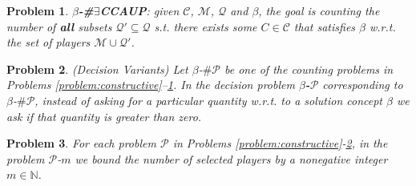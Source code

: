 \documentclass[letterpaper]{article} %
\newtheorem{problem}{Problem}
\newtheorem{remark}{Remark}
\begin{document}
\begin{problem}
\label{problem:exists-CCAUP}
{\normalfont \textbf{$\beta$-\#$\exists$CCAUP}:} given $\mathcal{C}$, $\mathcal{M}$, $\mathcal{Q}$ and $\beta$, the goal is counting the number of \textbf{all} subsets $\mathcal{Q}' \subseteq \mathcal{Q}$ s.t. there exists some $C \in \mathcal{C}$ that satisfies $\beta$ w.r.t. the set of players $\mathcal{M} \cup \mathcal{Q}'$.
\end{problem}
\begin{problem}
\label{problem:Decision} 
{\normalfont (Decision Variants)}
Let {\normalfont $\beta$-$\# \mathcal{P}$} be one of the counting problems in Problems \ref{problem:constructive}--\ref{problem:exists-CCAUP}. In the decision problem {\normalfont \textbf{$\beta$-$\mathcal{P}$}} corresponding to {\normalfont $\beta$-$\#\mathcal{P}$}, instead of asking for a particular quantity w.r.t. to a solution concept $\beta$ we ask if that quantity is greater than zero.
\end{problem}
\begin{problem}
\label{problem:bounded} 
For each problem {\normalfont $\mathcal{P}$} in Problems \ref{problem:constructive}-\ref{problem:Decision}, in the problem {\normalfont $\mathcal{P}$-$m$} we bound the number of selected players by a nonegative integer $m \in \mathbb{N}$.
\end{problem}
\end{document}
